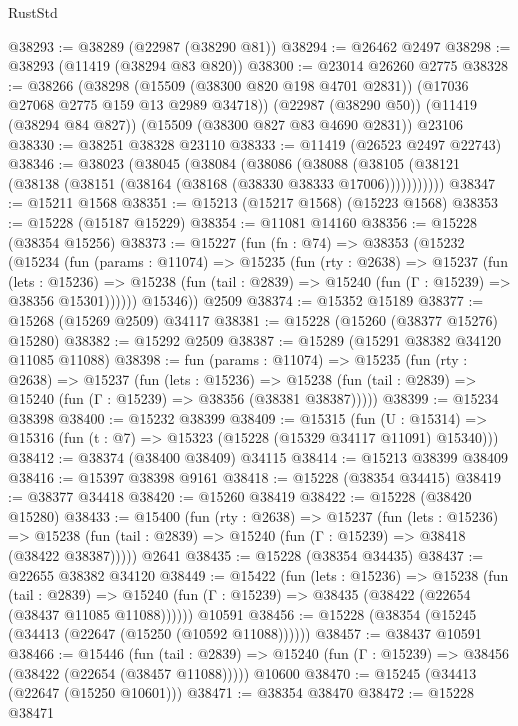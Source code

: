 \begin{lexlean}{RustStd}
\begin{coremodule}
@38293 := @38289 (@22987 (@38290 @81))
@38294 := @26462 @2497
@38298 := @38293 (@11419 (@38294 @83 @820))
@38300 := @23014 @26260 @2775
@38328 := @38266
    (@38298 (@15509 (@38300 @820 @198 @4701 @2831)) (@17036 @27068 @2775 @159 @13 @2989 @34718))
    (@22987 (@38290 @50))
    (@11419 (@38294 @84 @827))
    (@15509 (@38300 @827 @83 @4690 @2831))
    @23106
@38330 := @38251 @38328 @23110
@38333 := @11419 (@26523 @2497 @22743)
@38346 := @38023
    (@38045
      (@38084
        (@38086
          (@38088 (@38105 (@38121 (@38138 (@38151 (@38164 (@38168 (@38330 @38333 @17006)))))))))))
@38347 := @15211 @1568
@38351 := @15213 (@15217 @1568) (@15223 @1568)
@38353 := @15228 (@15187 @15229)
@38354 := @11081 @14160
@38356 := @15228 (@38354 @15256)
@38373 := @15227
    (fun (fn : @74) =>
    @38353
      (@15232
        (@15234
          (fun (params : @11074) =>
          @15235
            (fun (rty : @2638) =>
            @15237
              (fun (lets : @15236) =>
              @15238 (fun (tail : @2839) => @15240 (fun (Γ : @15239) => @38356 @15301))))))
        @15346))
    @2509
@38374 := @15352 @15189
@38377 := @15268 (@15269 @2509) @34117
@38381 := @15228 (@15260 (@38377 @15276) @15280)
@38382 := @15292 @2509
@38387 := @15289 (@15291 @38382 @34120 @11085 @11088)
@38398 := fun (params : @11074) =>
  @15235
    (fun (rty : @2638) =>
    @15237
      (fun (lets : @15236) =>
      @15238 (fun (tail : @2839) => @15240 (fun (Γ : @15239) => @38356 (@38381 @38387)))))
@38399 := @15234 @38398
@38400 := @15232 @38399
@38409 := @15315
    (fun (U : @15314) => @15316 (fun (t : @7) => @15323 (@15228 (@15329 @34117 @11091) @15340)))
@38412 := @38374 (@38400 @38409) @34115
@38414 := @15213 @38399 @38409
@38416 := @15397 @38398 @9161
@38418 := @15228 (@38354 @34415)
@38419 := @38377 @34418
@38420 := @15260 @38419
@38422 := @15228 (@38420 @15280)
@38433 := @15400
    (fun (rty : @2638) =>
    @15237
      (fun (lets : @15236) =>
      @15238 (fun (tail : @2839) => @15240 (fun (Γ : @15239) => @38418 (@38422 @38387)))))
    @2641
@38435 := @15228 (@38354 @34435)
@38437 := @22655 @38382 @34120
@38449 := @15422
    (fun (lets : @15236) =>
    @15238
      (fun (tail : @2839) =>
      @15240 (fun (Γ : @15239) => @38435 (@38422 (@22654 (@38437 @11085 @11088))))))
    @10591
@38456 := @15228 (@38354 (@15245 (@34413 (@22647 (@15250 (@10592 @11088))))))
@38457 := @38437 @10591
@38466 := @15446
    (fun (tail : @2839) => @15240 (fun (Γ : @15239) => @38456 (@38422 (@22654 (@38457 @11088)))))
    @10600
@38470 := @15245 (@34413 (@22647 (@15250 @10601)))
@38471 := @38354 @38470
@38472 := @15228 @38471

\end{coremodule}
\end{lexlean}
